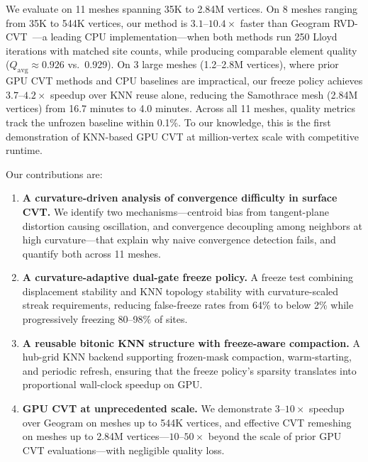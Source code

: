 We evaluate on 11 meshes spanning 35K to 2.84M vertices. On 8 meshes ranging from 35K to 544K vertices, our method is $3.1$--$10.4\times$ faster than Geogram RVD-CVT~\cite{levy2010lp}---a leading CPU implementation---when both methods run 250 Lloyd iterations with matched site counts, while producing comparable element quality ($Q_{\mathrm{avg}} \approx 0.926$ vs.\ 0.929). On 3 large meshes (1.2--2.8M vertices), where prior GPU CVT methods and CPU baselines are impractical, our freeze policy achieves $3.7$--$4.2\times$ speedup over KNN reuse alone, reducing the Samothrace mesh (2.84M vertices) from 16.7 minutes to 4.0 minutes. Across all 11 meshes, quality metrics track the unfrozen baseline within 0.1\%. To our knowledge, this is the first demonstration of KNN-based GPU CVT at million-vertex scale with competitive runtime.

Our contributions are:
\begin{enumerate}
    \item \textbf{A curvature-driven analysis of convergence difficulty in surface CVT.} We identify two mechanisms---centroid bias from tangent-plane distortion causing oscillation, and convergence decoupling among neighbors at high curvature---that explain why naive convergence detection fails, and quantify both across 11 meshes.

    \item \textbf{A curvature-adaptive dual-gate freeze policy.} A freeze test combining displacement stability and KNN topology stability with curvature-scaled streak requirements, reducing false-freeze rates from 64\% to below 2\% while progressively freezing 80--98\% of sites.

    \item \textbf{A reusable bitonic KNN structure with freeze-aware compaction.} A hub-grid KNN backend supporting frozen-mask compaction, warm-starting, and periodic refresh, ensuring that the freeze policy's sparsity translates into proportional wall-clock speedup on GPU.

    \item \textbf{GPU CVT at unprecedented scale.} We demonstrate $3$--$10\times$ speedup over Geogram on meshes up to 544K vertices, and effective CVT remeshing on meshes up to 2.84M vertices---$10$--$50\times$ beyond the scale of prior GPU CVT evaluations---with negligible quality loss.
\end{enumerate}
